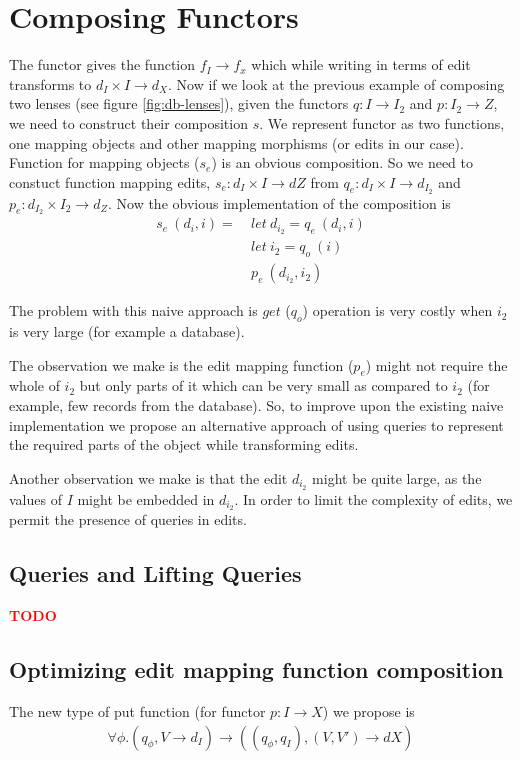 \documentclass[a4paper,10pt]{article}
\newcommand{\finish}[1]{#1}
\newcommand{\comment}[1]{\finish{\textbf{\textcolor{red}{#1}}}}
\begin{document}
\section{Composing Functors}
The functor gives the function $f_I \to f_x$ which while writing in
terms of edit transforms to $d_I \times I \to d_X$. Now if we look at
the previous example of composing two lenses (see figure
\ref{fig:db-lenses}), given the functors $q: I \to I_2$ and $p: I_2
\to Z$, we need to construct their composition $s$. We represent
functor as two functions, one mapping objects and other mapping
morphisms (or edits in our case). Function for mapping objects ($s_e$)
is an obvious composition. So we need to constuct function mapping
edits, $s_e: d_I \times I \to dZ$ from $q_{e}: d_I \times I \to
d_{I_2}$ and $p_{e}: d_{I_2} \times I_2 \to d_Z$. Now the obvious
implementation of the composition is
\begin{align*}
s_e~(d_i,i) =~& let~d_{i_2} = q_{e}~(d_i,i) \\
                 & let~i_2 = q_{o}~(i) \\
                 & p_{e}~(d_{i_2},i_2) 
\end{align*}

The problem with this naive approach is $get$ ($q_{o}$) operation is
very costly when $i_2$ is very large (for example a database). 

The observation we make is the edit mapping function ($p_{e}$)
might not require the whole of $i_2$ but only parts of it which can be
very small as compared to $i_2$ (for example, few records from the
database). So, to improve upon the existing naive implementation we
propose an alternative approach of using queries to represent the
required parts of the object while transforming edits.

Another observation we make is that the edit $d_{i_2}$ might be quite large, as
the values of $I$ might be embedded in $d_{i_2}$. In order to limit the complexity
of edits, we permit the presence of queries in edits.

\subsection{Queries and Lifting Queries}
\comment{TODO}

\subsection{Optimizing edit mapping function composition}
The new type of put function (for functor $p: I \to X$) we propose is
\begin{align*}
\forall \phi. (q_{\phi}, V \to d_I) \to ((q_{\phi},q_I), (V,V') \to dX) 
\end{align*}
\end{document}
